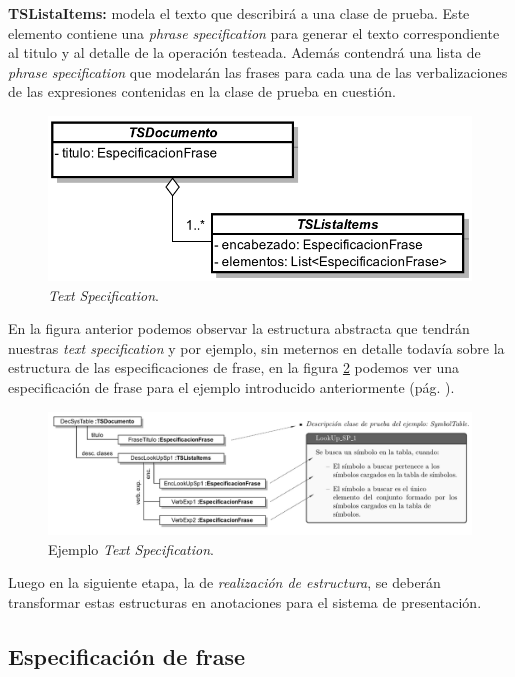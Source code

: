 \medskip
\noindent
\textbf{TSListaItems:} modela el texto que describirá a una clase de prueba. Este elemento contiene una \emph{phrase specification} para generar el texto correspondiente al titulo y al detalle de la operación testeada. Además contendrá una lista de \emph{phrase specification} que modelarán las frases para cada una de las verbalizaciones de las expresiones contenidas en la clase de prueba en cuestión.

\begin{figure}[H]
  	\centering
	\includegraphics[scale=0.3]{img/text_spec.png}
	\caption{\emph{Text Specification}.}
  	\label{fig:text_spec}
\end{figure}

En la figura anterior podemos observar la estructura abstracta que tendrán nuestras \emph{text specification} y por ejemplo, sin meternos en detalle todavía sobre la estructura de las especificaciones de frase, en la figura \ref{fig:text_spec} podemos ver una especificación de frase para el ejemplo introducido anteriormente (pág. \pageref{fig:ej_corpus}).

\begin{figure}[H]
  	\centering
	\includegraphics[scale=0.35]{img/ej_text_spec.png}
	\caption{Ejemplo \emph{Text Specification}.}
  	\label{fig:text_spec}
\end{figure}

Luego en la siguiente etapa, la de \emph{realización de estructura}, se deberán transformar estas estructuras en anotaciones para el sistema de presentación.

\subsection{Especificación de frase}

